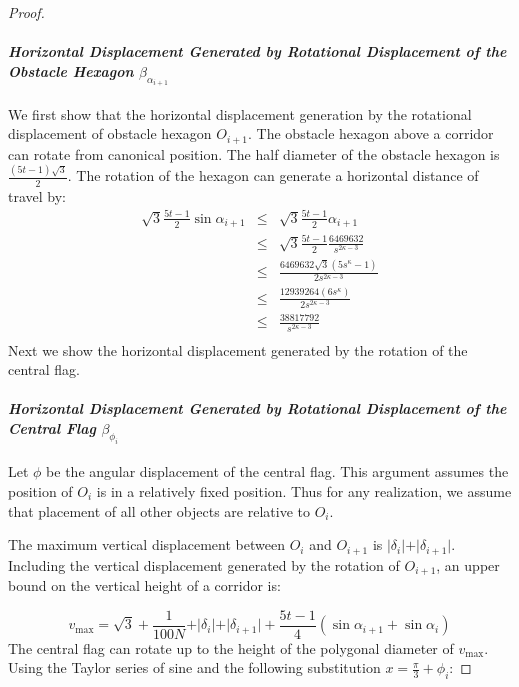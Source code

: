 \documentclass[10pt]{CSUNthesis}
\theoremstyle{plain}%
\theoremstyle{definition}
\theoremstyle{remark}
\newcommand{\lr}[1]{\left( #1 \right)}
\begin{document}
\begin{proof}
\paragraph{\textit{Horizontal Displacement Generated by Rotational Displacement of the Obstacle Hexagon} $\beta_{\alpha_{i+1}}$}
We first show that the horizontal displacement generation by the rotational displacement of obstacle hexagon $O_{i+1}$.  
The obstacle hexagon above a corridor can rotate from canonical position.  
The half diameter of the obstacle hexagon is $ \frac{(5t-1)\sqrt{3}}{2}$.  
The rotation of the hexagon can generate a horizontal distance of travel by:
\begin{equation}
\begin{array}{rcl}
\sqrt{3} \frac{5t-1}{2} \sin \alpha_{i+1} &\leq&\sqrt{3} \frac{5t-1}{2}  \alpha_{i+1} \\
&\leq& \sqrt{3} \frac{5t-1}{2} \frac{6469632}{s^{2\kappa-3}}\\
&\leq& \frac{6469632 \sqrt{3} \lr{5s^\kappa - 1}}{2s^{2\kappa-3}}\\
&\leq& \frac{12939264 \lr{6s^\kappa}}{2s^{2\kappa-3}}\\
&\leq& \frac{38817792}{s^{2\kappa-3}}\\
\end{array}
\end{equation}
Next we show the horizontal displacement generated by the rotation of the central flag.
\paragraph{\textit{Horizontal Displacement Generated by Rotational Displacement of the Central Flag} $\beta_{\phi_{i}}$}
Let $\phi$ be the angular displacement of the central flag.  
This argument assumes the position of $O_i$ is in a relatively fixed  position.  
Thus for any realization, we assume that placement of all other objects are relative to $O_i$.  

The maximum vertical displacement between $O_i$ and $O_{i+1}$ is $\vert \delta_i \vert + \vert \delta_{i+1} \vert$.  
Including the vertical displacement generated by the rotation of $O_{i+1}$, an upper bound on the vertical height of a corridor is:

$$v_\text{max}=\sqrt{3} + \frac{1}{100N} + \vert \delta_i \vert + \vert \delta_{i+1} \vert + \frac{5t-1}{4}  \lr{ \sin \alpha_{i+1} +  \sin \alpha_{i} }$$
The central flag can rotate up to the height of the polygonal diameter of $v_\text{max}$.  
Using the Taylor series of sine and the following substitution $x = \frac{\pi}{3} + \phi_i$:


\end{proof}
\end{document}
